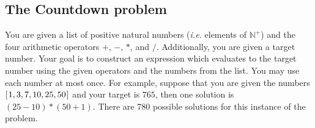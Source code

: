 \documentclass[10pt,a4paper,fleqn]{exam}
\newcommand {\lbrac} {\makebox[0pt]{[\kern-1ex[}}
\newcommand {\rbrac} {\makebox[0pt]{]\kern-1ex]}}
\newcommand{\denote}[1]{\lbrac~#1~\rbrac}
\begin{document}
\begin{questions}

\section{The Countdown problem}

\question You are given a list of positive natural numbers (\emph{i.e.} elements of $\mathbb{N}^{+}$) and the four arithmetic operators $+$, $-$, $*$, and $/$. Additionally, you are given a target number. Your goal is to construct an expression which evaluates to the target number using the given operators and the numbers from the list. You may use each number at most once. For example, suppose that you are given the numbers $[\mskip1.5mu 1,3,7,10,25,50 \mskip1.5mu]$ and your target is $765$, then one solution is $(25-10) * (50+1)$. There are 780 possible solutions for this instance of the problem.


\end{questions}
\end{document}

